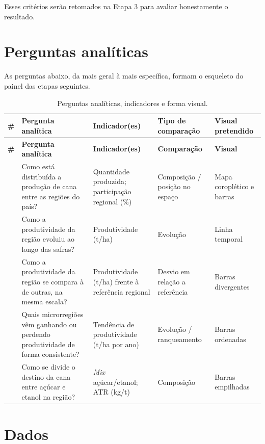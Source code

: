 \documentclass[11pt,a4paper]{article}
\begin{document}
Esses critérios serão retomados na Etapa 3 para avaliar honestamente o resultado.

\section{Perguntas analíticas}

As perguntas abaixo, da mais geral à mais específica, formam o esqueleto do painel das
etapas seguintes.

\begin{longtable}{c L{4.6cm} L{3.4cm} L{2.6cm} L{2.8cm}}
\caption{Perguntas analíticas, indicadores e forma visual.}\label{tab:perguntas}\\
\toprule
\textbf{\#} & \textbf{Pergunta analítica} & \textbf{Indicador(es)} & \textbf{Tipo de comparação} & \textbf{Visual pretendido}\\
\midrule
\endfirsthead
\toprule
\textbf{\#} & \textbf{Pergunta analítica} & \textbf{Indicador(es)} & \textbf{Comparação} & \textbf{Visual}\\
\midrule
\endhead
\bottomrule
{} & Como está distribuída a produção de cana entre as regiões do país? & Quantidade produzida; participação regional (\%) & Composição / posição no espaço & Mapa coroplético e barras\\
 & Como a produtividade da região evoluiu ao longo das safras? & Produtividade (t/ha) & Evolução & Linha temporal\\
 & Como a produtividade da região se compara à de outras, na mesma escala? & Produtividade (t/ha) frente à referência regional & Desvio em relação a referência & Barras divergentes\\
 & Quais microrregiões vêm ganhando ou perdendo produtividade de forma consistente? & Tendência de produtividade (t/ha por ano) & Evolução / ranqueamento & Barras ordenadas\\
 & Como se divide o destino da cana entre açúcar e etanol na região? & \textit{Mix} açúcar/etanol; ATR (kg/t) & Composição & Barras empilhadas\\
\end{longtable}

\section{Dados}
\end{document}
